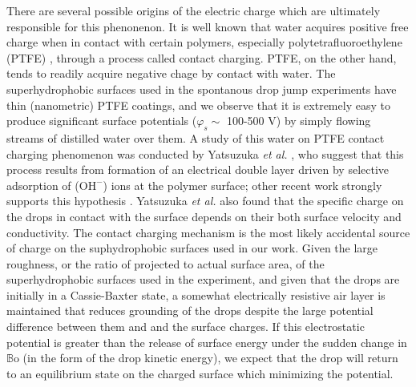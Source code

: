 \documentclass[12pt,a4paper,oneside]{book}
\begin{document}
There are several possible origins of the electric charge which are ultimately responsible for this phenonenon. It is well known that water acquires positive free charge when in contact with certain polymers, especially polytetrafluoroethylene (PTFE) \cite{langmuir_surface_1938}, through a process called contact charging. PTFE, on the other hand, tends to readily acquire negative chage by contact with water. The superhydrophobic surfaces used in the spontanous drop jump experiments have thin (nanometric) PTFE coatings, and we observe that it is extremely easy to produce significant surface potentials ($\varphi_s \sim$ 100-500 V) by simply flowing streams of distilled water over them. A study of this water on PTFE contact charging phenomenon was conducted by Yatsuzuka \emph{et al.} \cite{yatsuzuka_electrification_1994}, who suggest that this process results from formation of an electrical double layer driven by selective adsorption of ($\mbox{OH}^-$) ions at the polymer surface; other recent work strongly supports this hypothesis \cite{beattie_intrinsic_2006} \cite{strazdaite_water_2015}. Yatsuzuka \emph{et al.} also found that the specific charge on the drops in contact with the surface depends on their both surface velocity and conductivity. The contact charging mechanism is the most likely accidental source of charge on the suphydrophobic surfaces used in our work. Given the large roughness, or the ratio of projected to actual surface area, of the superhydrophobic surfaces used in the experiment, and given that the drops are initially in a Cassie-Baxter state, a somewhat electrically resistive air layer is maintained that reduces grounding of the drops despite the large potential difference between them and and the surface charges. If this electrostatic potential is greater than the release of surface energy under the sudden change in $\mathbb{B}\mbox{o}$ (in the form of the drop kinetic energy), we expect that the drop will return to an equilibrium state on the charged surface which minimizing the potential.
\end{document}
